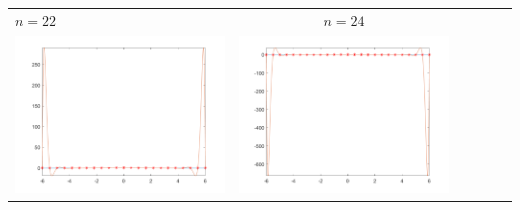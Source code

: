 \begin{tabular}{l*{5}{c}}
\hspace{3.5cm}\(n=22\) &  \(n=24\) \\
\includegraphics[scale=0.5]{cap4/4_9/22.png} &  \includegraphics[scale=0.5]{cap4/4_9/24.png} \\


\end{tabular}
